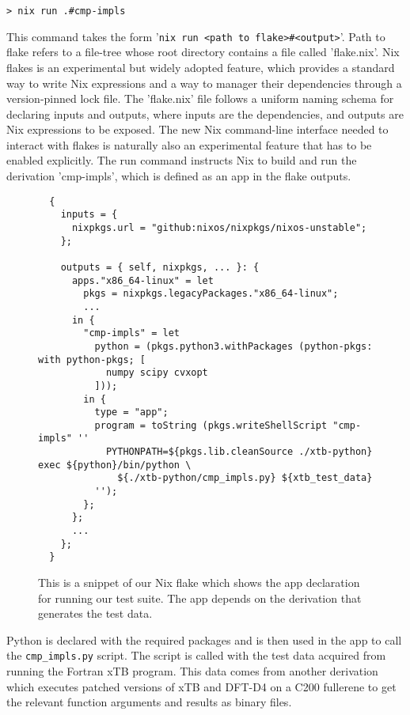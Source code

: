 \begin{verbatim}
> nix run .#cmp-impls
\end{verbatim}


This command takes the form '\verb|nix run <path to flake>#<output>|'. Path to flake refers to a file-tree whose root directory contains a file called 'flake.nix'. Nix flakes is an experimental but widely adopted feature, which provides a standard way to write Nix expressions and a way to manager their dependencies through a version-pinned lock file. The 'flake.nix' file follows a uniform naming schema for declaring inputs and outputs, where inputs are the dependencies, and outputs are Nix expressions to be exposed.
The new Nix command-line interface needed to interact with flakes is naturally also an experimental feature that has to be enabled explicitly. The run command instructs Nix to build and run the derivation 'cmp-impls', which is defined as an app in the flake outputs.

\newpage

\begin{figure}[H]
\begin{verbatim}
  {
    inputs = {
      nixpkgs.url = "github:nixos/nixpkgs/nixos-unstable";
    };

    outputs = { self, nixpkgs, ... }: {
      apps."x86_64-linux" = let
        pkgs = nixpkgs.legacyPackages."x86_64-linux";
        ...
      in {
        "cmp-impls" = let
          python = (pkgs.python3.withPackages (python-pkgs: with python-pkgs; [
            numpy scipy cvxopt
          ]));
        in {
          type = "app";
          program = toString (pkgs.writeShellScript "cmp-impls" ''
            PYTHONPATH=${pkgs.lib.cleanSource ./xtb-python} exec ${python}/bin/python \
              ${./xtb-python/cmp_impls.py} ${xtb_test_data}
          '');
        };
      };
      ...
    };
  }
\end{verbatim}
\caption{This is a snippet of our Nix flake which shows the app declaration for running our test suite. The app depends on the derivation that generates the test data.}
\label{fig:nix-flake}
\end{figure}

Python is declared with the required packages and is then used in the app to call the \verb|cmp_impls.py| script. The script is called with the test data acquired from running the Fortran xTB program. This data comes from another derivation which executes patched versions of xTB and DFT-D4 on a C200 fullerene to get the relevant function arguments and results as binary files.

